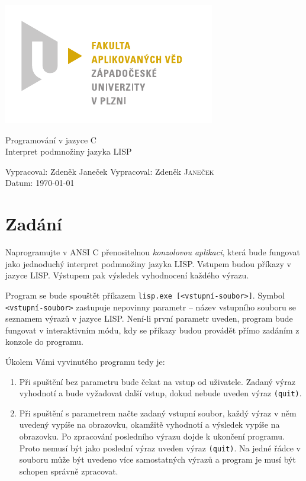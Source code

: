 \documentclass[a4paper, 12pt]{article}
\begin{document}
\begin{titlepage}
\includegraphics[bb=0 0 167 96]{fav_cmyk.pdf}
\vfill
\begin{center}
{\huge Programování v jazyce C}\\[3ex]
{\Large Interpret podmnožiny jazyka LISP}
\end{center}
\vfill
\begin{tabbing}
Vypracoval: \hspace{1ex}\=Zdeněk Janeček\kill
Vypracoval: \>Zdeněk \textsc{Janeček}\\[1ex]
Datum:\> \today
\end{tabbing}
\end{titlepage}

\tableofcontents

\section{Zadání}
Naprogramujte v ANSI C přenositelnou \emph{konzolovou aplikaci}, která
bude fungovat jako jednoduchý interpret podmnožiny jazyka LISP.
Vstupem budou příkazy v jazyce LISP. Výstupem pak výsledek vyhodnocení
každého výrazu.

Program se bude spouštět příkazem \texttt{lisp.exe
  [\textless{}vstupní-soubor\textgreater{}]}. Symbol
\texttt{\textless{}vstupní-soubor\textgreater{}} zastupuje nepovinny
parametr -- název vstupního souboru se seznamem výrazů v jazyce
LISP. Není-li první parametr uveden, program bude fungovat v
interaktivním módu, kdy se příkazy budou provádět přímo zadáním z
konzole do programu.

Úkolem Vámi vyvinutého programu tedy je:
\begin{enumerate}
\item Při spuštění bez parametru bude čekat na vstup od uživatele.
  Zadaný výraz vyhodnotí a bude vyžadovat další vstup, dokud nebude
  uveden výraz \texttt{(quit)}.
\item Při spuštění s parametrem načte zadaný vstupní soubor, každý
  výraz v něm uvedený vypíše na obrazovku, okamžitě vyhodnotí a
  výsledek vypíše na obrazovku. Po zpracování posledního výrazu dojde
  k ukončení programu. Proto nemusí být jako poslední výraz uveden
  výraz \texttt{(quit)}. Na jedné řádce v souboru může být uvedeno
  více samostatných výrazů a program je musí být schopen správně
  zpracovat.
\end{enumerate}
\end{document}
